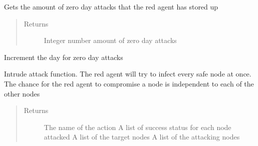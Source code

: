 \documentclass[letterpaper,10pt,english]{sphinxmanual}
\begin{document}
\begin{fulllineitems}

\begin{fulllineitems}
\label{\detokenize{source/yawning_titan.envs.generic.core:yawning_titan.envs.generic.core.red_action_set.RedActionSet.get_amount_zero_day}}
\sphinxAtStartPar
Gets the amount of zero day attacks that the red agent has stored up
\begin{quote}\begin{description}
\item[{Returns}] \leavevmode
\sphinxAtStartPar
Integer number \sphinxhyphen{} amount of zero day attacks

\end{description}\end{quote}

\end{fulllineitems}


\begin{fulllineitems}
\label{\detokenize{source/yawning_titan.envs.generic.core:yawning_titan.envs.generic.core.red_action_set.RedActionSet.increment_day}}
\sphinxAtStartPar
Increment the day for zero day attacks

\end{fulllineitems}


\begin{fulllineitems}
\label{\detokenize{source/yawning_titan.envs.generic.core:yawning_titan.envs.generic.core.red_action_set.RedActionSet.intrude}}
\sphinxAtStartPar
Intrude attack function. The red agent will try to infect every safe node at once. The chance for the red agent
to compromise a node is independent to each of the other nodes
\begin{quote}\begin{description}
\item[{Returns}] \leavevmode
\sphinxAtStartPar
The name of the action
A list of success status for each node attacked
A list of the target nodes
A list of the attacking nodes


\end{description}
\end{quote}
\end{fulllineitems}
\end{fulllineitems}
\end{document}
